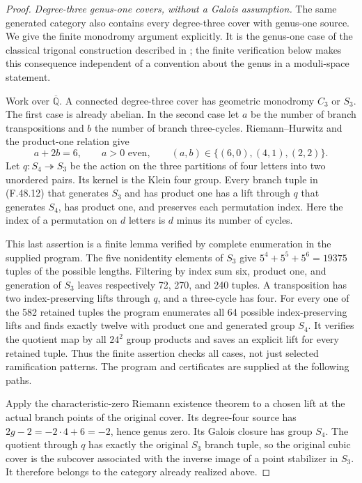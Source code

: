 \documentclass[11pt]{article}
\begin{document}
\begin{proof}
\emph{Degree-three genus-one covers, without a Galois assumption.}
The same generated category also contains every degree-three
cover with genus-one source. We give the finite monodromy
argument explicitly. It is the genus-one case of the
classical trigonal construction described in
\citet[Section~9.1, Remark~9.13]{FF_RecillasRodriguez2003};
the finite verification below makes this consequence
independent of a convention about the genus in a
moduli-space statement.

Work over \(\overline{\mathbb Q}\). A connected
degree-three cover has geometric monodromy \(C_3\)
or \(S_3\). The first case is already abelian.
In the second case let \(a\) be the number of branch
transpositions and \(b\) the number of branch
three-cycles. Riemann--Hurwitz and the product-one
relation give
\[
          a+2b=6,\qquad a>0\text{ even},\qquad
          (a,b)\in\{(6,0),(4,1),(2,2)\}.
                                                        \tag{F.48.12}
\]
Let \(q:S_4\twoheadrightarrow S_3\) be the action
on the three partitions of four letters into two
unordered pairs. Its kernel is the Klein four group.
Every branch tuple in (F.48.12) that generates
\(S_3\) and has product one has a lift through
\(q\) that generates \(S_4\), has product one,
and preserves each permutation index. Here the index
of a permutation on \(d\) letters is \(d\) minus
its number of cycles.

This last assertion is a finite lemma verified by
complete enumeration in the supplied program. The
five nonidentity elements of \(S_3\) give
\(5^4+5^5+5^6=19375\) tuples of the possible
lengths. Filtering by index sum six, product one,
and generation of \(S_3\) leaves respectively
72, 270, and 240 tuples. A transposition has two
index-preserving lifts through \(q\), and a
three-cycle has four. For every one of the 582
retained tuples the program enumerates all 64
possible index-preserving lifts and finds exactly
twelve with product one and generated group
\(S_4\). It verifies the quotient map by all
\(24^2\) group products and saves an explicit
lift for every retained tuple. Thus the finite
assertion checks all cases, not just selected
ramification patterns. The program and certificates
are supplied at the following paths.



Apply the characteristic-zero Riemann existence
theorem to a chosen lift at the actual branch
points of the original cover. Its degree-four
source has
\(2g-2=-2\cdot4+6=-2\), hence genus zero.
Its Galois closure has group \(S_4\). The quotient
through \(q\) has exactly the original
\(S_3\) branch tuple, so the original cubic
cover is the subcover associated with the inverse
image of a point stabilizer in \(S_3\).
It therefore belongs to the category already
realized above.


\end{proof}
\end{document}
